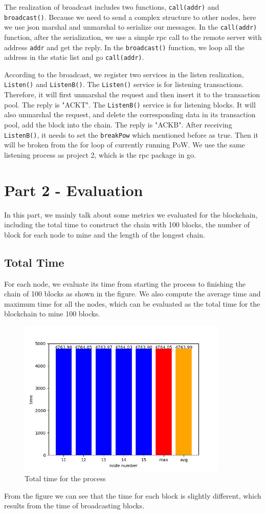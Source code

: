 \documentclass{article}
\begin{document}
     The realization of broadcast includes two functions, \verb|call(addr)| and \verb|broadcast()|. Because we need to send a complex structure to other nodes, here we use json marshal and unmarshal to serialize our messages. In the \verb|call(addr)| function, after the serialization, we use a simple rpc call to the remote server with address \verb|addr| and get the reply. In the \verb|broadcast()| function, we loop all the address in the static list and go \verb|call(addr)|.

     According to the broadcast, we register two services in the listen realization, \verb|Listen()| and \verb|ListenB()|. The \verb|Listen()| service is for listening transactions. Therefore, it will first unmarshal the request and then insert it to the transaction pool. The reply is "ACKT". The \verb|ListenB()| service is for listening blocks. It will also unmarshal the request, and delete the corresponding data in its transaction pool, add the block into the chain. The reply is "ACKB". After receiving \verb|ListenB()|, it needs to set the \verb|breakPow| which mentioned before as true. Then it will be broken from the for loop of currently running PoW. We use the same listening process as project 2, which is the rpc package in go.  
     
    \section{Part 2 - Evaluation}\label{sec:part-rvevaluatioern}
    In this part, we mainly talk about some metrics we evaluated for the blockchain, including the total time to construct the chain with 100 blocks, the number of block for each node to mine and the length of the longest chain.
    \subsection{Total Time}
    For each node, we evaluate its time from starting the process to finishing the chain of 100 blocks as shown in the figure. We also compute the average time and maximum time for all the nodes, which can be evaluated as the total time for the blockchain to mine 100 blocks. 
    \begin{figure}[H]
        \centering
        \includegraphics[width=10cm]{./eval/time.png}
        \caption{Total time for the process}
        \label{fig:my_label}
    \end{figure}
    From the figure we can see that the time for each block is slightly different, which results from the time of broadcasting blocks.
\end{document}
